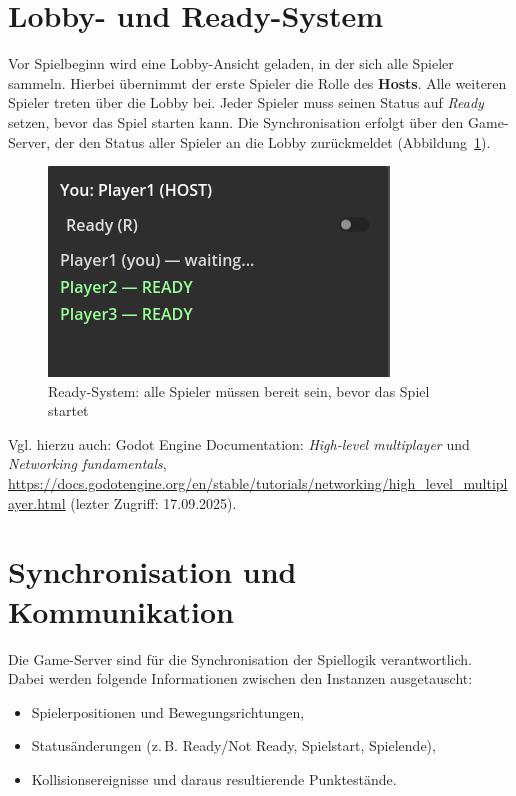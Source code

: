 \newpage
\section{Lobby- und Ready-System}
Vor Spielbeginn wird eine Lobby-Ansicht geladen, in der sich alle Spieler sammeln.  
Hierbei übernimmt der erste Spieler die Rolle des \textbf{Hosts}.  
Alle weiteren Spieler treten über die Lobby bei.  
Jeder Spieler muss seinen Status auf \textit{Ready} setzen, bevor das Spiel starten kann.  
Die Synchronisation erfolgt über den Game-Server, der den Status aller Spieler an die Lobby zurückmeldet (Abbildung~\ref{fig:ready_system}).

\begin{figure}[h!]
  \centering
  \includegraphics[width=0.4\linewidth]{../images/ready.png}
  \caption{Ready-System: alle Spieler müssen bereit sein, bevor das Spiel startet}
  \label{fig:ready_system}
\end{figure}

\noindent
Vgl. hierzu auch:  
Godot Engine Documentation: \textit{High-level multiplayer} und \textit{Networking fundamentals},  
\url{https://docs.godotengine.org/en/stable/tutorials/networking/high_level_multiplayer.html} (lezter Zugriff: 17.09.2025).  


\section{Synchronisation und Kommunikation}
Die Game-Server sind für die Synchronisation der Spiellogik verantwortlich.  
Dabei werden folgende Informationen zwischen den Instanzen ausgetauscht:
\begin{itemize}
  \item Spielerpositionen und Bewegungsrichtungen,
  \item Statusänderungen (z.\,B. Ready/Not Ready, Spielstart, Spielende),
  \item Kollisionsereignisse und daraus resultierende Punktestände.
\end{itemize}

